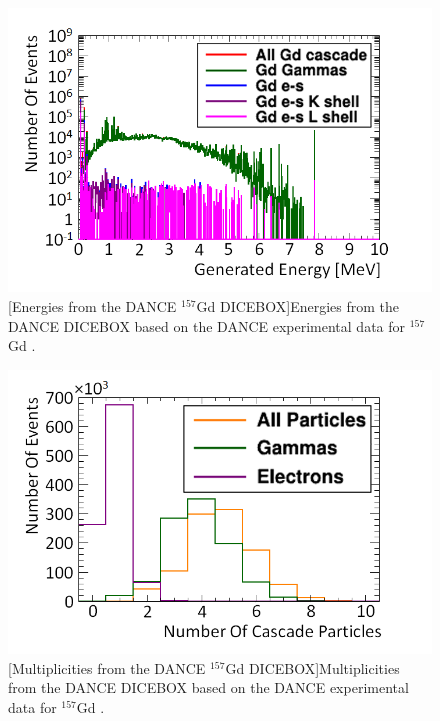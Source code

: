 \begin{figure}[!h]
\centering
\begin{minipage}{.45\textwidth}
  \centering
  \includegraphics[width=\linewidth]{Chapter4/Figs/Raster/gadolinium/gadoliniumEnergiesCascadeMedText.png}
  [Energies from the DANCE $^{157}$Gd  DICEBOX]{Energies from the DANCE DICEBOX based on the DANCE experimental data for $^{157}$Gd \cite{Chyzh_2011}.} 
  \label{fig:gadoliniumEnergiesCascade}
\end{minipage}%
\qquad
\begin{minipage}{.45\textwidth}
  \centering
  \includegraphics[width=\linewidth]{Chapter4/Figs/Raster/gadolinium/gadoliniumMultipliciesBreakdownCascadeMedText.png} 
  [Multiplicities from the DANCE $^{157}$Gd  DICEBOX]{Multiplicities from the DANCE DICEBOX based on the DANCE experimental data for $^{157}$Gd \cite{Chyzh_2011}. }
  \label{fig:gadoliniumMultipliciesBreakdownCascade}
\end{minipage}
\end{figure}

